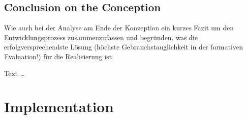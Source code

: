 \documentclass[11pt,a4paper,english]{scrreprt}
\newenvironment{comment}
  {\par\medskip
   \begingroup\color{olive}%
   }
 {\endgroup
  \medskip}
\begin{document}
\section{Conclusion on the Conception}
\begin{comment}
Wie auch bei der Analyse am Ende der Konzeption ein kurzes Fazit um den Entwicklungsprozess zusammenzufassen und begründen, was die erfolgversprechendste Lösung (höchste Gebrauchstauglichkeit in der formativen Evaluation!) für die Realisierung ist.
\end{comment}

Text \dots

\newpage
\chapter{Implementation}\label{chapter:implementation}
\end{document}

